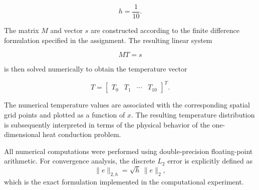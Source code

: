 \begin{equation}
    h=\frac{1}{10}.
\end{equation}

The matrix $M$ and vector $s$ are constructed according to the finite difference
formulation specified in the assignment. The resulting linear system

\begin{equation}
    MT=s
\end{equation}

is then solved numerically to obtain the temperature vector

\begin{equation}
    T =
    \begin{bmatrix}
        T_0 & T_1 & \cdots & T_{10}
    \end{bmatrix}^{T}.
\end{equation}

The numerical temperature values are associated with the corresponding spatial
grid points and plotted as a function of $x$. The resulting temperature
distribution is subsequently interpreted in terms of the physical behavior of
the one-dimensional heat conduction problem.

All numerical computations were performed using double-precision floating-point
arithmetic. For convergence analysis, the discrete $L_2$ error is explicitly defined as
\begin{equation}
    \|e\|_{2,h} = \sqrt{h} \, \|e\|_2,
\end{equation}
which is the exact formulation implemented in the computational experiment.